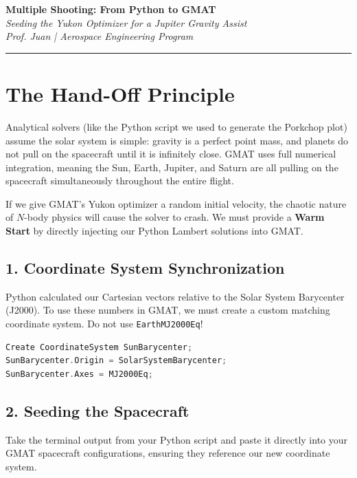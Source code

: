 \documentclass[11pt, letterpaper]{article}
\begin{document}
\begin{center}
    {\Large \textbf{Multiple Shooting: From Python to GMAT}} \\
    \vspace{0.2cm}
    {\large \textit{Seeding the Yukon Optimizer for a Jupiter Gravity Assist}} \\
    \vspace{0.4cm}
    \textit{Prof. Juan | Aerospace Engineering Program}
\end{center}
\hrule
\vspace{0.5cm}

\section*{The Hand-Off Principle}
Analytical solvers (like the Python script we used to generate the Porkchop plot) assume the solar system is simple: gravity is a perfect point mass, and planets do not pull on the spacecraft until it is infinitely close. GMAT uses full numerical integration, meaning the Sun, Earth, Jupiter, and Saturn are all pulling on the spacecraft simultaneously throughout the entire flight. 

If we give GMAT's Yukon optimizer a random initial velocity, the chaotic nature of $N$-body physics will cause the solver to crash. We must provide a \textbf{Warm Start} by directly injecting our Python Lambert solutions into GMAT.

\subsection*{1. Coordinate System Synchronization}
Python calculated our Cartesian vectors relative to the Solar System Barycenter (J2000). To use these numbers in GMAT, we must create a custom matching coordinate system. Do not use \texttt{EarthMJ2000Eq}!

\begin{lstlisting}[language=C++]
% In your GMAT Resources:
Create CoordinateSystem SunBarycenter;
SunBarycenter.Origin = SolarSystemBarycenter;
SunBarycenter.Axes = MJ2000Eq;
\end{lstlisting}

\subsection*{2. Seeding the Spacecraft}
Take the terminal output from your Python script and paste it directly into your GMAT spacecraft configurations, ensuring they reference our new coordinate system.
\end{document}
